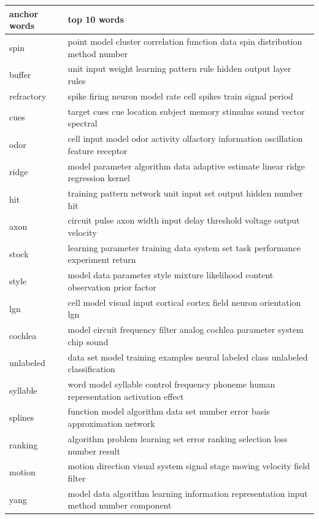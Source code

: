\documentclass{article}
\begin{document}
\hspace{-0.7cm}
  \begin{tabular}{ l | l }
    \hline 
    \bf{anchor words} & \bf{top 10 words}\\ \hline
    spin & point model cluster correlation function data spin distribution method number \\ \hline 
    buffer & unit input weight learning pattern rule hidden output layer rules \\ \hline 
    refractory & spike firing neuron model rate cell spikes train signal period \\ \hline 
    cues & target cues cue location subject memory stimulus sound vector spectral \\ \hline 
    odor & cell input model odor activity olfactory information oscillation feature receptor \\ \hline 
    ridge & model parameter algorithm data adaptive estimate linear ridge regression kernel \\ \hline 
    hit & training pattern network unit input set output hidden number hit \\ \hline 
    axon & circuit pulse axon width input delay threshold voltage output velocity \\ \hline 
    stock & learning parameter training data system set task performance experiment return \\ \hline 
    style & model data parameter style mixture likelihood content observation prior factor \\ \hline 
    lgn & cell model visual input cortical cortex field neuron orientation lgn \\ \hline 
    cochlea & model circuit frequency filter analog cochlea parameter system chip sound \\ \hline 
    unlabeled & data set model training examples neural labeled class unlabeled classification \\ \hline 
    syllable & word model syllable control frequency phoneme human representation activation effect \\ \hline 
    splines & function model algorithm data set number error basis approximation network \\ \hline 
    ranking & algorithm problem learning set error ranking selection loss number result \\ \hline 
    motion & motion direction visual system signal stage moving velocity field filter \\ \hline 
    yang & model data algorithm learning information representation input method number component \\ \hline 

\end{tabular}
\end{document}
